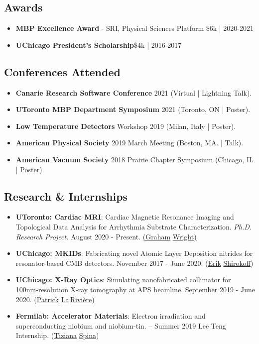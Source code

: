 \documentclass[12pt]{article}
\begin{document}
\subsection*{\sf Awards}
\begin{itemize}
	\item [] { \bf MBP Excellence Award} - SRI, Physical Sciences Platform \hfill \$6k | 2020-2021
	\item [] { \bf UChicago President's Scholarship}\hfill \$4k | 2016-2017
\end{itemize}

\subsection*{\sf Conferences Attended}
\begin{itemize}
\item[] {\bf Canarie Research Software Conference} 2021 (Virtual | Lightning Talk).
\item[] {\bf UToronto MBP Department Symposium} 2021 (Toronto, ON | Poster).
\item[] {\bf Low Temperature Detectors} Workshop 2019 (Milan, Italy | Poster).
\item[] {\bf American Physical Society} 2019 March Meeting (Boston, MA. | Talk). 
\item[] {\bf American Vacuum Society} 2018 Prairie Chapter Symposium (Chicago, IL | Poster). 
\end{itemize}

\subsection*{\sf Research \& Internships}
\begin{itemize}
  \item[] \textbf{UToronto: Cardiac MRI}: Cardiac Magnetic Resonance Imaging and Topological Data Analysis for Arrhythmia Substrate Characterization. \emph{Ph.D. Research Project.} August 2020 - Present.  \hfill {\href{https://medbio.utoronto.ca/faculty/wright}{(Graham$\,\,$Wright)}}
\item[] \textbf{UChicago: MKIDs}: Fabricating novel Atomic Layer Deposition nitrides for resonator-based CMB detectors. November 2017 - June 2020. \hfill (\href{http://kicp.uchicago.edu/~shiro/erik/}{Erik$\,\,$Shirokoff})
\item[] \textbf{UChicago: X-Ray Optics}: Simulating nanofabricated collimator for 100nm-resolution X-ray tomography at APS beamline. September 2019 - June 2020. \hfill (\href{https://voices.uchicago.edu/larivierelab/}{Patrick$\,\,$La$\,$Rivi\`ere})
\item[] \textbf{Fermilab: Accelerator Materials}: Electron irradiation and superconducting niobium and niobium-tin. -- Summer 2019 Lee Teng Internship.  \hfill (\href{https://www.linkedin.com/in/tiziana-spina-74114646}{Tiziana$\,\,$Spina})


\end{itemize}
\end{document}
